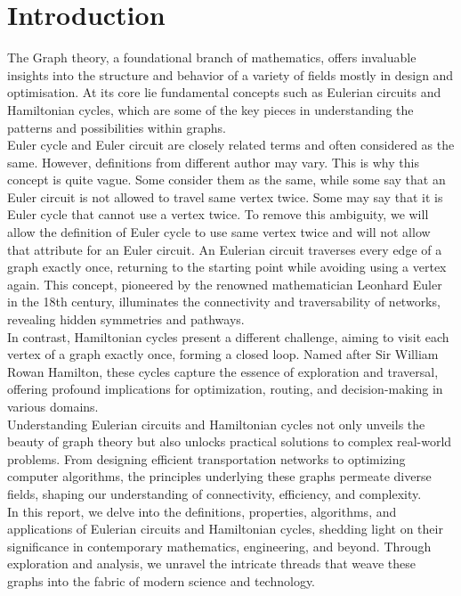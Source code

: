 \documentclass[14pt, times, a4paper]{extarticle}
\begin{document}
\section{Introduction}
The \gls{Graph theory}, a foundational branch of mathematics, offers invaluable insights into the structure and behavior of a variety of fields mostly in design and optimisation. At its core lie fundamental concepts such as Eulerian circuits and Hamiltonian \gls{cycles}, which are some of the key pieces in understanding the patterns and possibilities within graphs.\\[0.3cm]
Euler cycle and Euler circuit are closely related terms and often considered as the same. However, definitions from different author may vary. This is why this concept is quite vague. Some consider them as the same, while some say that an Euler circuit is not allowed to travel same vertex twice. Some may say that it is Euler cycle that cannot use a vertex twice. To remove this ambiguity, we will allow the definition of Euler cycle to use same vertex twice and will not allow that attribute for an Euler circuit.
An \gls{Eulerian circuit} traverses every \gls{edge} of a \gls{graph} exactly once, returning to the starting point while avoiding using a vertex again. This concept, pioneered by the renowned mathematician Leonhard Euler in the 18th century, illuminates the connectivity and traversability of networks, revealing hidden symmetries and pathways.\\[0.3cm]
In contrast, \gls{Hamiltonian cycles} present a different challenge, aiming to visit each \gls{vertex} of a graph exactly once, forming a closed loop. Named after Sir William Rowan Hamilton, these cycles capture the essence of exploration and traversal, offering profound implications for optimization, routing, and decision-making in various domains.\\[0.3cm]
Understanding Eulerian circuits and Hamiltonian cycles not only unveils the beauty of graph theory but also unlocks practical solutions to complex real-world problems. From designing efficient transportation networks to optimizing computer algorithms, the principles underlying these graphs permeate diverse fields, shaping our understanding of connectivity, efficiency, and complexity.\\[0.3cm]
In this report, we delve into the definitions, properties, algorithms, and applications of Eulerian circuits and Hamiltonian cycles, shedding light on their significance in contemporary mathematics, engineering, and beyond. Through exploration and analysis, we unravel the intricate threads that weave these graphs into the fabric of modern science and technology.
\end{document}
